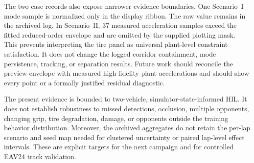 The two case records also expose narrower evidence boundaries. One Scenario~I
mode sample is normalized only in the display ribbon. The raw value remains in
the archived log. In Scenario~II, 37 measured acceleration samples exceed the
fitted reduced-order envelope and are omitted by the supplied plotting mask.
This prevents interpreting the tire panel as universal plant-level constraint
satisfaction. It does not change the logged corridor containment, mode
persistence, tracking, or separation results. Future work should reconcile the
preview envelope with measured high-fidelity plant accelerations and should
show every point or a formally justified residual diagnostic.

The present evidence is bounded to two-vehicle, simulator-state-informed HIL.
It does not establish robustness to missed detections, occlusion, multiple
opponents, changing grip, tire degradation, damage, or opponents outside the
training behavior distribution. Moreover, the archived aggregates do not
retain the per-lap scenario and seed map needed for clustered uncertainty or
paired lap-level effect intervals. These are explicit targets for the next
campaign and for controlled EAV24 track validation.
